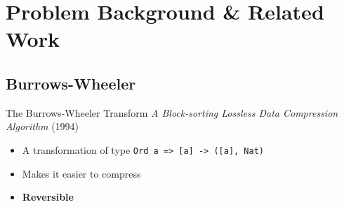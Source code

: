 \documentclass{beamer}
\begin{document}
  \section{Problem Background \& Related Work}

  \subsection{Burrows-Wheeler}

  \tableofcontents[
    sectionstyle=show/shaded,
    subsectionstyle=show/shaded,
    subsubsectionstyle=show/show/hide/hide,
  ]

  \begin{frame}{The Burrows-Wheeler Transform}
    \textit{A Block-sorting Lossless Data Compression Algorithm} (1994)
    \begin{itemize}
    \item<1-> A transformation of type \texttt{Ord a => [a] -> ([a], Nat)}
    \item<2-> Makes it easier to compress
    \item<4-> \textbf{Reversible}
    \end{itemize}
  \end{frame}
\end{document}
